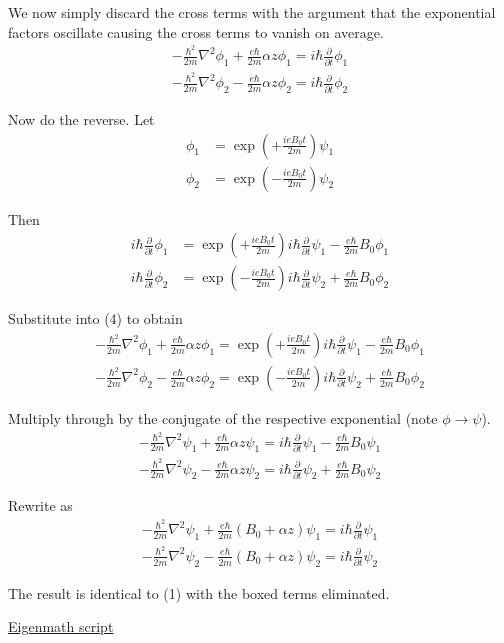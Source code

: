 We now simply discard the cross terms
with the argument that the exponential factors oscillate causing
the cross terms to vanish on average.
\begin{equation*}
\begin{aligned}
-\frac{\hbar^2}{2m}\nabla^2\phi_1
+\frac{e\hbar}{2m}\alpha z\phi_1
=i\hbar\frac{\partial}{\partial t}\phi_1
\\[1ex]
-\frac{\hbar^2}{2m}\nabla^2\phi_2
-\frac{e\hbar}{2m}\alpha z\phi_2
=i\hbar\frac{\partial}{\partial t}\phi_2
\end{aligned}
\tag{4}
\end{equation*}

Now do the reverse. Let
\begin{align*}
\phi_1&=\exp\left(+\frac{ieB_0t}{2m}\right)\psi_1
\\
\phi_2&=\exp\left(-\frac{ieB_0t}{2m}\right)\psi_2
\end{align*}

Then
\begin{align*}
i\hbar\frac{\partial}{\partial t}\phi_1
&=\exp\left(+\frac{ieB_0t}{2m}\right)i\hbar\frac{\partial}{\partial t}\psi_1
-\frac{e\hbar}{2m}B_0\phi_1
\\
i\hbar\frac{\partial}{\partial t}\phi_2
&=\exp\left(-\frac{ieB_0t}{2m}\right)i\hbar\frac{\partial}{\partial t}\psi_2
+\frac{e\hbar}{2m}B_0\phi_2
\end{align*}

Substitute into (4) to obtain
\begin{align*}
-\frac{\hbar^2}{2m}\nabla^2\phi_1
+\frac{e\hbar}{2m}\alpha z\phi_1
=\exp\left(+\frac{ieB_0t}{2m}\right)i\hbar\frac{\partial}{\partial t}\psi_1
-\frac{e\hbar}{2m}B_0\phi_1
\\[1ex]
-\frac{\hbar^2}{2m}\nabla^2\phi_2
-\frac{e\hbar}{2m}\alpha z\phi_2
=\exp\left(-\frac{ieB_0t}{2m}\right)i\hbar\frac{\partial}{\partial t}\psi_2
+\frac{e\hbar}{2m}B_0\phi_2
\end{align*}

Multiply through by the conjugate of the respective exponential
(note $\phi\rightarrow\psi$).
\begin{align*}
-\frac{\hbar^2}{2m}\nabla^2\psi_1
+\frac{e\hbar}{2m}\alpha z\psi_1
=i\hbar\frac{\partial}{\partial t}\psi_1
-\frac{e\hbar}{2m}B_0\psi_1
\\[1ex]
-\frac{\hbar^2}{2m}\nabla^2\psi_2
-\frac{e\hbar}{2m}\alpha z\psi_2
=i\hbar\frac{\partial}{\partial t}\psi_2
+\frac{e\hbar}{2m}B_0\psi_2
\end{align*}

Rewrite as
\begin{align*}
-\frac{\hbar^2}{2m}\nabla^2\psi_1
+\frac{e\hbar}{2m}(B_0+\alpha z)\psi_1
=i\hbar\frac{\partial}{\partial t}\psi_1
\\[1ex]
-\frac{\hbar^2}{2m}\nabla^2\psi_2
-\frac{e\hbar}{2m}(B_0+\alpha z)\psi_2
=i\hbar\frac{\partial}{\partial t}\psi_2
\end{align*}

The result is identical to (1) with the boxed terms eliminated.

\bigskip
\href{https://georgeweigt.github.io/examples/stern-gerlach-1-demo.html}{Eigenmath script}


